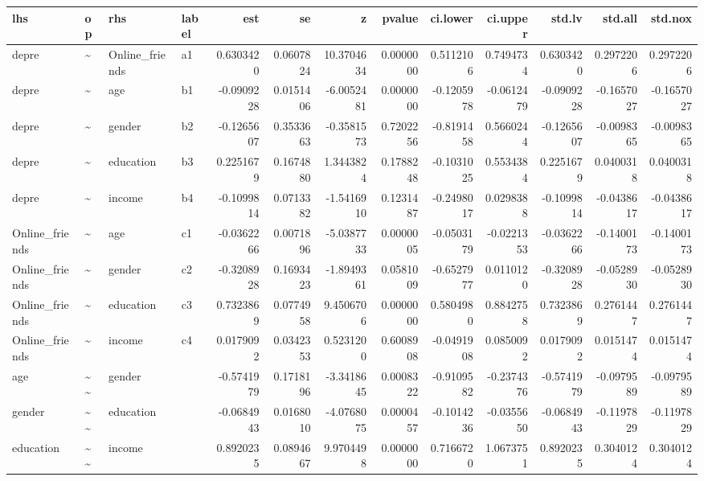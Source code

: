 \documentclass[
]{article}
\begin{document}
\begin{table}[!h]
\centering
\begin{tabular}[t]{llllrrrrrrrrr}
\toprule
lhs & op & rhs & label & est & se & z & pvalue & ci.lower & ci.upper & std.lv & std.all & std.nox\\
\midrule
depre & \textasciitilde{} & Online\_friends & a1 & 0.6303420 & 0.0607824 & 10.3704634 & 0.0000000 & 0.5112106 & 0.7494734 & 0.6303420 & 0.2972206 & 0.2972206\\
depre & \textasciitilde{} & age & b1 & -0.0909228 & 0.0151406 & -6.0052481 & 0.0000000 & -0.1205978 & -0.0612479 & -0.0909228 & -0.1657027 & -0.1657027\\
depre & \textasciitilde{} & gender & b2 & -0.1265607 & 0.3533663 & -0.3581573 & 0.7202256 & -0.8191458 & 0.5660244 & -0.1265607 & -0.0098365 & -0.0098365\\
depre & \textasciitilde{} & education & b3 & 0.2251679 & 0.1674880 & 1.3443824 & 0.1788248 & -0.1031025 & 0.5534384 & 0.2251679 & 0.0400318 & 0.0400318\\
depre & \textasciitilde{} & income & b4 & -0.1099814 & 0.0713382 & -1.5416910 & 0.1231487 & -0.2498017 & 0.0298388 & -0.1099814 & -0.0438617 & -0.0438617\\
\addlinespace
Online\_friends & \textasciitilde{} & age & c1 & -0.0362266 & 0.0071896 & -5.0387733 & 0.0000005 & -0.0503179 & -0.0221353 & -0.0362266 & -0.1400173 & -0.1400173\\
Online\_friends & \textasciitilde{} & gender & c2 & -0.3208928 & 0.1693423 & -1.8949361 & 0.0581009 & -0.6527977 & 0.0110120 & -0.3208928 & -0.0528930 & -0.0528930\\
Online\_friends & \textasciitilde{} & education & c3 & 0.7323869 & 0.0774958 & 9.4506706 & 0.0000000 & 0.5804980 & 0.8842758 & 0.7323869 & 0.2761447 & 0.2761447\\
Online\_friends & \textasciitilde{} & income & c4 & 0.0179092 & 0.0342353 & 0.5231200 & 0.6008908 & -0.0491908 & 0.0850092 & 0.0179092 & 0.0151474 & 0.0151474\\
age & \textasciitilde{}\textasciitilde{} & gender &  & -0.5741979 & 0.1718196 & -3.3418645 & 0.0008322 & -0.9109582 & -0.2374376 & -0.5741979 & -0.0979589 & -0.0979589\\
\addlinespace
gender & \textasciitilde{}\textasciitilde{} & education &  & -0.0684943 & 0.0168010 & -4.0768075 & 0.0000457 & -0.1014236 & -0.0355650 & -0.0684943 & -0.1197829 & -0.1197829\\
education & \textasciitilde{}\textasciitilde{} & income &  & 0.8920235 & 0.0894667 & 9.9704498 & 0.0000000 & 0.7166720 & 1.0673751 & 0.8920235 & 0.3040124 & 0.3040124\\

\end{tabular}
\end{table}
\end{document}
